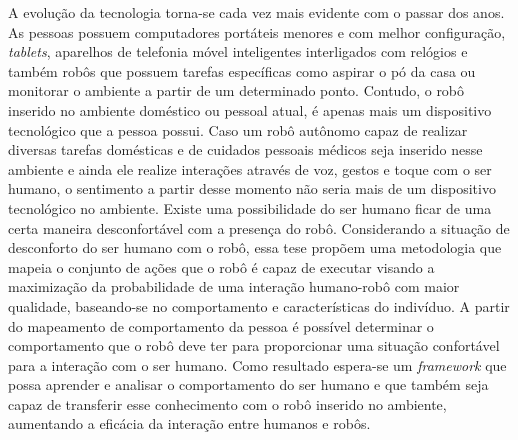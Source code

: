 
\begin{resumo}
A evolução da tecnologia torna-se cada vez mais evidente com o passar dos anos. As pessoas possuem computadores portáteis menores e com melhor configuração, \emph{tablets}, aparelhos de telefonia móvel inteligentes interligados com relógios e também robôs que possuem tarefas específicas como aspirar o pó da casa ou monitorar o ambiente a partir de um determinado ponto. Contudo, o robô inserido no ambiente doméstico ou pessoal atual, é apenas mais um dispositivo tecnológico que a pessoa possui. Caso um robô autônomo capaz de realizar diversas tarefas domésticas e de cuidados pessoais médicos seja inserido nesse ambiente e ainda ele realize interações através de voz, gestos e toque com o ser humano, o sentimento a partir desse momento não seria mais de um dispositivo tecnológico no ambiente. Existe uma possibilidade do ser humano ficar de uma certa maneira desconfortável com a presença do robô. Considerando a situação de desconforto do ser humano com o robô, essa tese propõem uma metodologia que mapeia o conjunto de ações que o robô é capaz de executar visando a maximização da probabilidade de uma interação humano-robô com maior qualidade, baseando-se no comportamento e características do indivíduo. A partir do mapeamento de comportamento da pessoa é possível determinar o comportamento que o robô deve ter para proporcionar uma situação confortável para a interação com o ser humano. Como resultado espera-se um \emph{framework} que possa aprender e analisar o comportamento do ser humano e que também seja capaz de transferir esse conhecimento com o robô inserido no ambiente, aumentando a eficácia da interação entre humanos e robôs.

\end{resumo}
